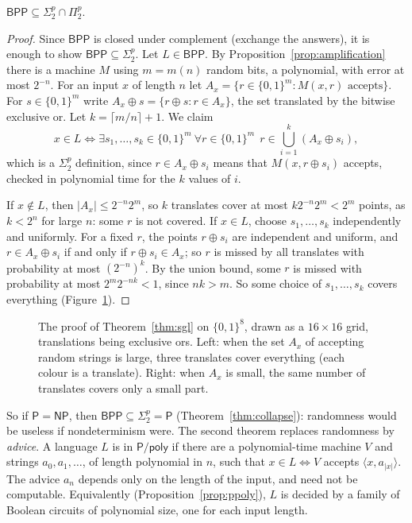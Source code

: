 \begin{theorem}\label{thm:sgl}
$\mathsf{BPP}\subseteq\Sigma_2^p\cap\Pi_2^p$.
\end{theorem}

\begin{proof}
Since $\mathsf{BPP}$ is closed under complement (exchange the answers), it is enough to show $\mathsf{BPP}\subseteq\Sigma_2^p$. Let $L\in\mathsf{BPP}$. By Proposition~\ref{prop:amplification} there is a machine $M$ using $m=m(n)$ random bits, a polynomial, with error at most $2^{-n}$. For an input $x$ of length $n$ let $A_x=\{r\in\{0,1\}^m:M(x,r)\text{ accepts}\}$. For $s\in\{0,1\}^m$ write $A_x\oplus s=\{r\oplus s:r\in A_x\}$, the set translated by the bitwise exclusive or. Let $k=\lceil m/n\rceil+1$. We claim
\[
x\in L\iff\exists s_1,\dots,s_k\in\{0,1\}^m\ \forall r\in\{0,1\}^m\ \ r\in\bigcup_{i=1}^k(A_x\oplus s_i),
\]
which is a $\Sigma_2^p$ definition, since $r\in A_x\oplus s_i$ means that $M(x,r\oplus s_i)$ accepts, checked in polynomial time for the $k$ values of $i$.

If $x\notin L$, then $|A_x|\le2^{-n}2^m$, so $k$ translates cover at most $k2^{-n}2^m<2^m$ points, as $k<2^n$ for large $n$: some $r$ is not covered. If $x\in L$, choose $s_1,\dots,s_k$ independently and uniformly. For a fixed $r$, the points $r\oplus s_i$ are independent and uniform, and $r\in A_x\oplus s_i$ if and only if $r\oplus s_i\in A_x$; so $r$ is missed by all translates with probability at most $(2^{-n})^k$. By the union bound, some $r$ is missed with probability at most $2^m2^{-nk}<1$, since $nk>m$. So some choice of $s_1,\dots,s_k$ covers everything (Figure~\ref{fig:lautemann}).
\end{proof}

\begin{figure}[ht]
\centering
{}
\caption{The proof of Theorem~\ref{thm:sgl} on $\{0,1\}^8$, drawn as a $16\times16$ grid, translations being exclusive ors. Left: when the set $A_x$ of accepting random strings is large, three translates cover everything (each colour is a translate). Right: when $A_x$ is small, the same number of translates covers only a small part.}
\label{fig:lautemann}
\end{figure}

So if $\mathsf P=\mathsf{NP}$, then $\mathsf{BPP}\subseteq\Sigma_2^p=\mathsf P$ (Theorem~\ref{thm:collapse}): randomness would be useless if nondeterminism were. The second theorem replaces randomness by \emph{advice}. A language $L$ is in $\mathsf P/\mathsf{poly}$ if there are a polynomial-time machine $V$ and strings $a_0,a_1,\dots$, of length polynomial in $n$, such that $x\in L\iff V$ accepts $\langle x,a_{|x|}\rangle$. The advice $a_n$ depends only on the length of the input, and need not be computable. Equivalently (Proposition~\ref{prop:ppoly}), $L$ is decided by a family of Boolean circuits of polynomial size, one for each input length.

